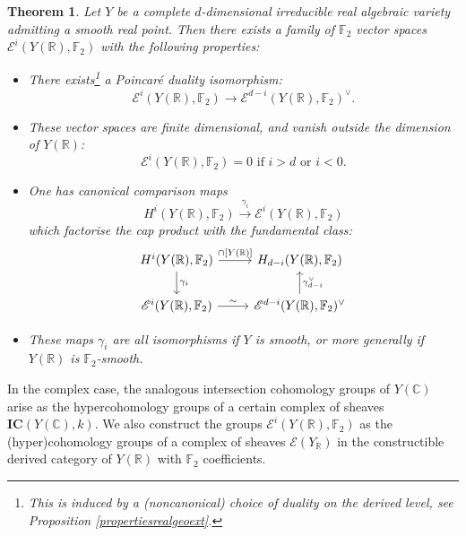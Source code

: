 \documentclass{amsart}
\newtheorem{thm}{Theorem}[section]
\theoremstyle{definition}
\theoremstyle{remark}
\begin{document}
\begin{thm}\label{Thm:coh of real geo ext}
Let $Y$ be a complete $d$-dimensional irreducible real algebraic variety admitting a smooth real point. Then there exists a family of $\mathbb{F}_2$ vector spaces $\mathscr{E}^i(Y(\mathbb{R}),\mathbb{F}_2)$ with the following properties:

\begin{itemize}
    \item There exists\footnote{This is induced by a (noncanonical) choice of duality on the derived level, see Proposition \ref{propertiesrealgeoext}.} a Poincaré duality isomorphism: \[\mathscr{E}^i(Y(\mathbb{R}),\mathbb{F}_2)\to \mathscr{E}^{d-i}(Y(\mathbb{R}),\mathbb{F}_2)^\vee.\]
     \item These vector spaces are finite dimensional, and vanish outside the dimension of $Y(\mathbb{R})$:\[\mathscr{E}^i(Y(\mathbb{R}),\mathbb{F}_2)=0 \text{ if } i>d \text{ or } i<0.\]
    \item One has canonical comparison maps \[H^i(Y(\mathbb{R}),\mathbb{F}_2)\xrightarrow{\gamma_i} \mathscr{E}^i(Y(\mathbb{R}),\mathbb{F}_2)\] which factorise the cap product with the fundamental class: \[\begin{tikzcd}
H^i(Y(\mathbb{R}),\mathbb{F}_2)\arrow[r,"\cap \text{[}Y(\mathbb{R})\text{]} "]\arrow[d,"\gamma_i"]&H_{d-i}(Y(\mathbb{R}),\mathbb{F}_2)\\
\mathscr{E}^i(Y(\mathbb{R}),\mathbb{F}_2)\arrow[r,"\sim"]&\mathscr{E}^{d-i}(Y(\mathbb{R}),\mathbb{F}_2)^\vee\arrow[u,"\gamma_{d-i}^\vee"']
\end{tikzcd}\]
    \item These maps $\gamma_i$ are all isomorphisms if $Y$ is smooth, or more generally if $Y(\mathbb{R})$ is $\mathbb{F}_2$-smooth.
\end{itemize}
\end{thm}

In the complex case, the analogous intersection cohomology groups of $Y(\mathbb{C})$ arise as the hypercohomology groups of a certain complex of sheaves $\mathbf{IC}(Y(\mathbb{C}),k)$.
We also construct the groups $\mathscr{E}^i(Y(\mathbb{R}),\mathbb{F}_2)$ as the (hyper)cohomology groups of a complex of sheaves $\mathscr{E}(Y_\mathbb{R})$ in the constructible derived category of $Y(\mathbb{R})$ with $\mathbb{F}_2$ coefficients.
\end{document}
